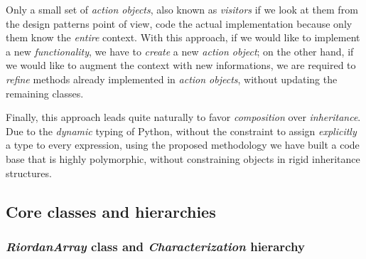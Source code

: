 Only a small set of \emph{action objects}, also known as \emph{visitors} if
we look at them from the design patterns \cite{Gamma:1995:DPE:186897} point of
view, code the actual implementation because only them know the \emph{entire}
context.  With this approach, if we would like to implement a new
\emph{functionality}, we have to \emph{create} a new \emph{action object}; on
the other hand, if we would like to augment the context with new informations,
we are required to \emph{refine} methods already implemented in \emph{action
objects}, without updating the remaining classes.

Finally, this approach leads quite naturally to favor \emph{composition} over
\emph{inheritance}. Due to the \emph{dynamic} typing of Python, without the
constraint to assign \emph{explicitly} a type to every expression, using the
proposed methodology we have built a code base that is highly polymorphic,
without constraining objects in rigid inheritance structures.

\subsection{Core classes and hierarchies}

\subsubsection{\emph{RiordanArray} class and \emph{Characterization} hierarchy}

